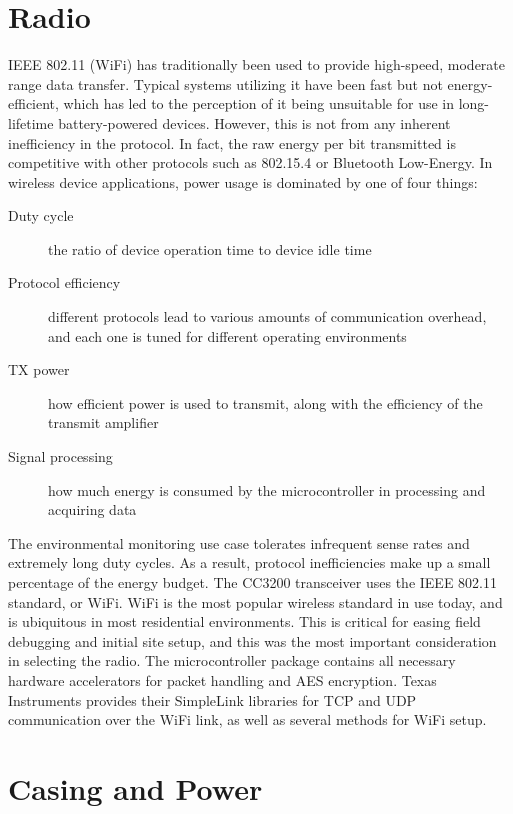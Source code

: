 \section{Radio}

IEEE 802.11 (WiFi) has traditionally been used to provide high-speed, moderate range data transfer. Typical systems utilizing it have been fast but not energy-efficient, which has led to the perception of it being unsuitable for use in long-lifetime battery-powered devices. However, this is not from any inherent inefficiency in the protocol. In fact, the raw energy per bit transmitted is competitive with other protocols such as 802.15.4 or Bluetooth Low-Energy\cite{DanielDobkin2009}. In wireless device applications, power usage is dominated by one of four things:

\begin{description}
\item[Duty cycle] the ratio of device operation time to device idle time
\item[Protocol efficiency] different protocols lead to various amounts of communication overhead, and each one is tuned for different operating environments
\item[TX power] how efficient power is used to transmit, along with the efficiency of the transmit amplifier
\item[Signal processing] how much energy is consumed by the microcontroller in processing and acquiring data 
\end{description}

The environmental monitoring use case tolerates infrequent sense rates and extremely long duty cycles. As a result, protocol inefficiencies make up a small percentage of the energy budget. The CC3200 transceiver uses the IEEE 802.11 standard, or WiFi. WiFi is the most popular wireless standard in use today, and is ubiquitous in most residential environments. This is critical for easing field debugging and initial site setup, and this was the most important consideration in selecting the radio. The microcontroller package contains all necessary hardware accelerators for packet handling and AES encryption. Texas Instruments provides their SimpleLink libraries for TCP and UDP communication over the WiFi link, as well as several methods for WiFi setup. 

\section{Casing and Power}

